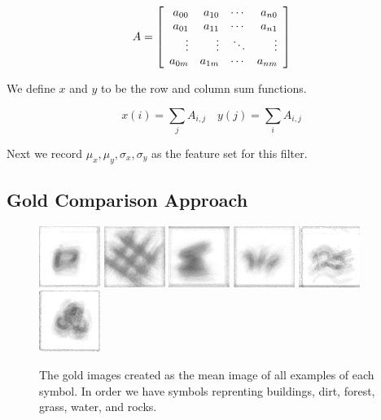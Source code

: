 \documentclass[preprint,3p,12pt]{elsarticle}
\begin{document}
\[
A =
\left [
    \begin{array}{r r r r}
        a_{00} & a_{10} & \cdots & a_{n0} \\
        a_{01} & a_{11} & \cdots & a_{n1}\\
        \vdots  & \vdots  & \ddots & \vdots\\
        a_{0m} & a_{1m} & \cdots & a_{nm}\\
    \end{array}
\right ]
\]

We define $x$ and $y$ to be the row and column sum functions.

\begin{equation}
x(i) = \sum_{j}{A_{i,j}} \quad
y(j) = \sum_{i}{A_{i,j}}
\end{equation}

Next we record $\mu_x, \mu_y, \sigma_x, \sigma_y$ as the feature set for this filter.


\subsection{Gold Comparison Approach}


\begin{figure}[h]
\includegraphics{building-mean}
\includegraphics{dirt-mean}
\includegraphics{forest-mean}
\includegraphics{grass-mean}
\includegraphics{water-mean}
\includegraphics{rocks-mean}

\caption{The gold images created as the mean image of all examples of each symbol. In order we have symbols reprenting buildings, dirt, forest, grass, water, and rocks.}

\end{figure}
\end{document}

